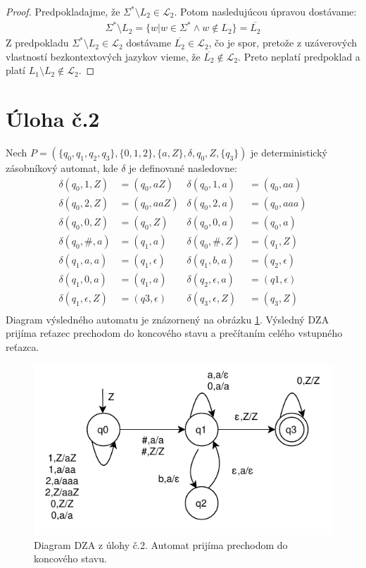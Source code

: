 \documentclass[10pt]{article}
\begin{document}
\begin{enumerate}
\begin{proof}
        Predpokladajme, že $\Sigma^* \setminus L_2 \in \mathcal{L}_2$. Potom nasledujúcou úpravou
        dostávame:
        \begin{align*}
            \Sigma^* \setminus L_2 = \{w | w \in \Sigma^* \land w \notin L_2 \} = \overline{L_2} 
        \end{align*}
        Z predpokladu $ \Sigma^* \setminus L_2 \in \mathcal{L}_2$ dostávame $\overline{L_2} \in
        \mathcal{L}_2$, čo je spor, pretože z uzáverových vlastností bezkontextových jazykov vieme,
        že $\overline{L_2} \notin \mathcal{L}_2$. Preto neplatí predpoklad a platí $L_1 \setminus L_2 \notin
        \mathcal{L}_2$.
    \end{proof}
\end{enumerate}
\section*{Úloha č.2}
    Nech $P = (\{q_0, q_1, q_2, q_3\}, \{0,1,2\}, \{a,Z\}, \delta, q_0, Z, \{q_3\})$ je deterministický zásobníkový automat, kde
    $\delta$ je definované nasledovne:
    \begin{align*}
        \delta (q_0, 1, Z) &= (q_0, aZ)  & \delta (q_0, 1, a) &= (q_0, aa)\\
        \delta (q_0, 2, Z) &= (q_0, aaZ) & \delta (q_0, 2, a) &= (q_0, aaa)\\
        \delta (q_0, 0, Z) &= (q_0, Z)   & \delta (q_0, 0, a) &= (q_0, a)\\
        \delta (q_0, \#, a) &= (q_1, a)   & \delta (q_0, \#, Z) &= (q_1, Z)\\
        \delta (q_1, a, a) &= (q_1, \epsilon) & \delta (q_1, b, a) &= (q_2, \epsilon)\\
        \delta (q_1, 0, a) &= (q_1, a)   & \delta (q_2, \epsilon, a) &= (q1, \epsilon)\\
        \delta (q_1, \epsilon, Z) &= (q3, \epsilon) & \delta (q_3, \epsilon, Z) &= (q_3, Z)\\
    \end{align*}
    Diagram výsledného automatu je znázornený na obrázku \ref{automata}. Výsledný DZA prijíma
    reťazec prechodom do koncového stavu a prečítaním celého vstupného reťazca.

\begin{figure}
    \label{automata}
    \centering
    \includegraphics{dpda.pdf}
    \caption{Diagram DZA z úlohy č.2. Automat prijíma prechodom do koncového stavu.}
\end{figure}
\end{document}
